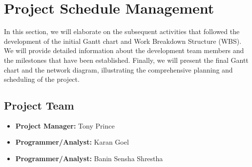 \chapter{Project Schedule Management}
In this section, we will elaborate on the subsequent activities that followed the development of the initial Gantt chart and Work Breakdown Structure (WBS). We will provide detailed information about the development team members and the milestones that have been established. Finally, we will present the final Gantt chart and the network diagram, illustrating the comprehensive planning and scheduling of the project.


\section{Project Team}
\begin{itemize}
    \item \textbf{Project Manager:} Tony Prince
    \item \textbf{Programmer/Analyst:} Karan Goel
    \item \textbf{Programmer/Analyst:} Banin Sensha Shrestha
\end{itemize}

